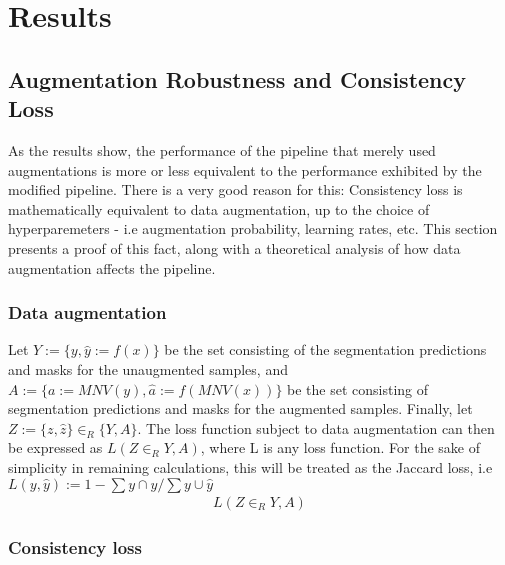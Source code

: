 \chapter{Results}
\setcounter{chapter}{5}

\section{Augmentation Robustness and Consistency Loss}
As the results show, the performance of the pipeline that merely used augmentations is more or less equivalent to the performance exhibited by the modified pipeline. There is a very good reason for this: Consistency loss is mathematically equivalent to data augmentation, up to the choice of hyperparemeters - i.e augmentation probability, learning rates, etc. This section presents a proof of this fact, along with a theoretical analysis of how data augmentation affects the pipeline. 
\subsection{Data augmentation}
Let \(Y:=\{y,\hat{y}:=f(x)\}\) be the set consisting of the segmentation predictions and masks for the unaugmented samples, and \(A:=\{a:=MNV(y),\hat{a}:=f(MNV(x))\}\) be the set consisting of segmentation predictions and masks for the augmented samples. Finally, let \(Z:=\{z, \hat{z}\} \in_R \{Y, A\} \). The loss function subject to data augmentation can then be expressed as \(L(Z \in_R Y,A)\), where L is any loss function. For the sake of simplicity in remaining calculations, this will be treated as the Jaccard loss, i.e \(L(y,\hat{y}):=1-\sum y\cap \hat{y} / \sum y \cup \hat{y}\) 
\begin{align*}
L(Z \in_R Y,A)  
\end{align*}
\subsection{Consistency loss}


